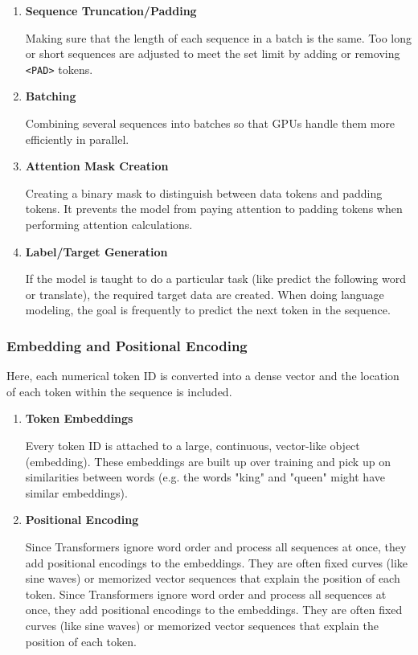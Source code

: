 \begin{enumerate}
    \item \textbf{Sequence Truncation/Padding}
    
     Making sure that the length of each sequence in a batch is the same. Too long or short sequences are adjusted to meet the set limit by adding or removing \texttt{<PAD>} tokens.

    \item \textbf{Batching}
    
    Combining several sequences into batches so that GPUs handle them more efficiently in parallel.
    
    \item \textbf{Attention Mask Creation}
    
    Creating a binary mask to distinguish between data tokens and padding tokens. It prevents the model from paying attention to padding tokens when performing attention calculations.

    \item \textbf{Label/Target Generation}
    
    If the model is taught to do a particular task (like predict the following word or translate), the required target data are created. When doing language modeling, the goal is frequently to predict the next token in the sequence.
    
\end{enumerate}

\subsubsection{Embedding and Positional Encoding}
Here, each numerical token ID is converted into a dense vector and the location of each token within the sequence is included.

\begin{enumerate}
    \item \textbf{Token Embeddings}  
    
    Every token ID is attached to a large, continuous, vector-like object (embedding). These embeddings are built up over training and pick up on similarities between words (e.g. the words "king" and "queen" might have similar embeddings).
    
    \item \textbf{Positional Encoding}

    Since Transformers ignore word order and process all sequences at once, they add positional encodings to the embeddings. They are often fixed curves (like sine waves) or memorized vector sequences that explain the position of each token. Since Transformers ignore word order and process all sequences at once, they add positional encodings to the embeddings. They are often fixed curves (like sine waves) or memorized vector sequences that explain the position of each token.
\end{enumerate}
    
